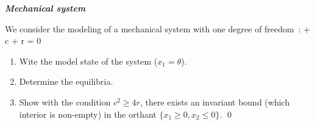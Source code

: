 \begin{exercice}{\bf \em Mechanical system}

We consider the modeling of a mechanical system with one degree of freedom~:
\eqnn
\ddot \theta + c \dot \theta + r \sin \theta = 0
\eeqnn
\begin{enumerate}
\item Wite the model state of the system ($x_1 = \theta$).
\item Determine the equilibria.
\item Show with the condition $c^2 \geq 4 r$, there exists an invariant bound (which interior is non-empty) in the orthant $\{ x_1 \geq 0, x_2 \leq 0 \}$. \qed
\end{enumerate}
\end{exercice}




